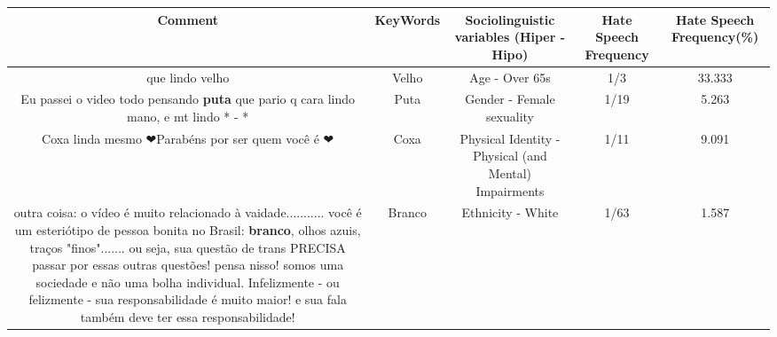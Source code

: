\documentclass[11pt]{article}
\newlength\mylength
\begin{document}
\begin{center}
\setlength\mylength{\dimexpr\textwidth - 1\arrayrulewidth - 50\tabcolsep}
\begin{longtable}{|C{.65\mylength}|C{.30\mylength}|C{.12\mylength}|C{.12\mylength}|C{.12\mylength}|}
\hline
\textbf{Comment} & \textbf{KeyWords} & \textbf{Sociolinguistic variables (Hiper - Hipo)}  & \textbf{Hate Speech Frequency} & \textbf{Hate Speech Frequency(\%)} \\
\hline{}\small que lindo velho\normalsize   & Velho & Age - Over 65s & 1/3 & 33.333 \\  \hline
  \small Eu passei o video  todo pensando \textbf{puta} que pario q cara lindo  mano, e mt lindo * - *\normalsize   & Puta & Gender - Female sexuality & 1/19 & 5.263 \\  \hline
  \small Coxa linda mesmo ❤Parabéns por ser quem você é ❤\normalsize   & Coxa & Physical Identity - Physical (and Mental) Impairments & 1/11 & 9.091 \\  \hline
  \small outra coisa: o vídeo é muito relacionado à vaidade........... você é um esteriótipo de pessoa bonita no Brasil: \textbf{branco}, olhos azuis, traços "finos"....... ou seja, sua questão de trans PRECISA passar por essas outras questões! pensa nisso! somos uma sociedade e não uma bolha individual. Infelizmente - ou felizmente -  sua responsabilidade é muito maior! e sua fala também deve ter essa responsabilidade!\normalsize   & Branco & Ethnicity - White & 1/63 & 1.587 \\  \hline

\end{longtable}
\end{center}
\end{document}
